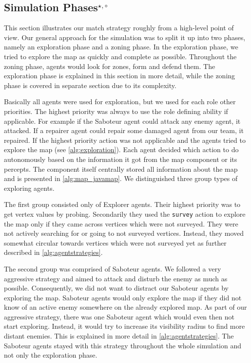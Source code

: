 \subsection[Simulation Phases]{Simulation Phases$^{\star,\circ}$}\label{arc:simulation}
This section illustrates our match strategy roughly from a high-level point of view.
Our general approach for the simulation was to split it up into two phases, namely an exploration phase and a zoning phase.
In the exploration phase, we tried to explore the map as quickly and complete as possible.
Throughout the zoning phase, agents would look for zones, form and defend them.
The exploration phase is explained in this section in more detail, while the zoning phase is covered in separate section due to its complexity.

Basically all agents were used for exploration, but we used for each role other priorities.
The highest priority was always to use the role defining ability if applicable.
For example if the Saboteur agent could attack any enemy agent, it attacked.
If a repairer agent could repair some damaged agent from our team, it repaired.
If the highest priority action was not applicable and the agents tried to explore the map (see \autoref{alg:exploration}).
Each agent decided which action to do autonomously based on the information it got from the map component or its percepts.
The component itself centrally stored all information about the map and is presented in \autoref{alg:map_javamap}.
We distinguished three group types of exploring agents.

The first group consisted only of Explorer agents.
Their highest priority was to get vertex values by probing.
Secondarily they used the \texttt{survey} action to explore the map only if they came across vertices which were not surveyed.
They were not actively searching for or going to not surveyed vertices.
Instead, they moved somewhat circular towards vertices which were not surveyed yet as further described in \autoref{alg:agentstrategies}.

The second group was comprised of Saboteur agents.
We followed a very aggressive strategy and aimed to attack and disturb the enemy as much as possible.
Consequently, we did not want to distract our Saboteur agents by exploring the map.
Saboteur agents would only explore the map if they did not know of an active enemy somewhere on the already explored map.
As part of our aggressive strategy, there was one Saboteur agent which would even then not start exploring.
Instead, it would try to increase its visibility radius to find more distant enemies.
This is explained in more detail in \autoref{alg:agentstrategies}.
The Saboteur agents stayed with this strategy throughout the whole simulation and not only the exploration phase.

